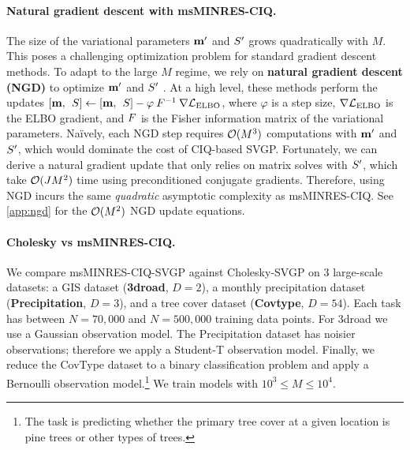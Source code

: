 \paragraph{Natural gradient descent with msMINRES-CIQ.}
The size of the variational parameters $\mathbf{m}'$ and $S'$ grows quadratically with $M$.
This poses a challenging optimization problem for standard gradient descent methods.
To adapt to the large $M$ regime, we rely on {\bf natural gradient descent (NGD)} to optimize $\mathbf{m}'$ and $S'$ \citep[e.g.][]{hensman2012fast,salimbeni2018natural}.
At a high level, these methods perform the updates $[\mathbf{m}, \:\: S] \gets [\mathbf{m}, \:\: S] - \varphi \: F^{-1} \: \nabla \mathcal L_\text{ELBO}$,
where $\varphi$ is a step size, $\nabla \mathcal L_\text{ELBO}$ is the ELBO gradient, and $F$ is the {Fisher information matrix} of the variational parameters.
%
Na\"ively, each NGD step requires $\bigo{M^3}$ computations with $\mathbf{m}'$ and $S'$, which would dominate the cost of CIQ-based SVGP.
Fortunately, we can derive a natural gradient update that only relies on matrix solves with $S'$, which take $\bigo{J M^2}$ time using preconditioned conjugate gradients.
Therefore, using NGD incurs the same \emph{quadratic} asymptotic complexity as msMINRES-CIQ.
See \cref{app:ngd} for the $\bigo{M^2}$ NGD update equations.

\paragraph{Cholesky vs msMINRES-CIQ.}
We compare msMINRES-CIQ-SVGP against Cholesky-SVGP on 3 large-scale datasets: a GIS dataset ({\bf 3droad}, $D=2$), a monthly precipitation dataset ({\bf Precipitation}, $D=3$), and a tree cover dataset ({\bf Covtype}, $D=54$).
Each task has between $N=70,\!000$ and $N=500,\!000$ training data points.
For 3droad we use a Gaussian observation model.
The Precipitation dataset has noisier observations; therefore we apply a Student-T observation model.
Finally, we reduce the CovType dataset to a binary classification problem and apply a Bernoulli observation model.\footnote{
  The task is predicting whether the primary tree cover at a given location is pine trees or other types of trees.
}
We train models with $ 10^3 \le M \le 10^4$.

